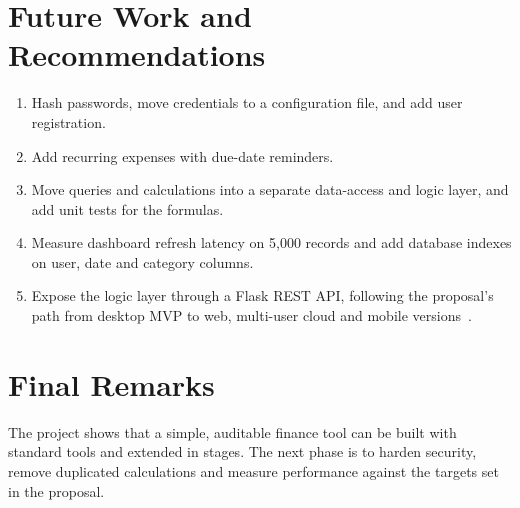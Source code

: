 \documentclass{tietreport}
\begin{document}
\section{Future Work and Recommendations}

\begin{enumerate}
  \item Hash passwords, move credentials to a configuration file,
    and add user registration.
  \item Add recurring expenses with due-date reminders.
  \item Move queries and calculations into a separate data-access
    and logic layer, and add unit tests for the formulas.
  \item Measure dashboard refresh latency on 5,000 records and add
    database indexes on user, date and category columns.
  \item Expose the logic layer through a Flask REST API, following
    the proposal's path from desktop MVP to web, multi-user cloud
    and mobile versions~\cite{pfmproposal}.
\end{enumerate}

\section{Final Remarks}

The project shows that a simple, auditable finance tool can be
built with standard tools and extended in stages. The next phase
is to harden security, remove duplicated calculations and
measure performance against the targets set in the proposal.


\printbibliography[heading=bibintoc]
\end{document}
